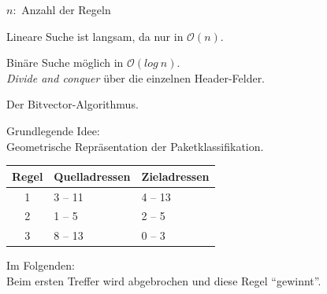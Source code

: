 \documentclass[xcolor=x11names,compress]{beamer}
\renewcommand{\(}{\begin{columns}}
\renewcommand{\)}{\end{columns}}
\newcommand{\<}[1]{\begin{column}{#1}}
\renewcommand{\>}{\end{column}}
\begin{document}
\begin{frame}
  $n:$ Anzahl der Regeln
  \begin{tcolorbox}[colback=red!5!white,colframe=red!75!black,title=Problem,drop fuzzy shadow]
  Lineare Suche ist langsam, da nur in $\mathcal O(n)$.
  \end{tcolorbox}
  \pause
  \begin{tcolorbox}[colback=yellow!5!white,colframe=yellow!75!black,title=Grundidee,drop fuzzy shadow]
  Binäre Suche möglich in $\mathcal O(log\ n)$.\\
  \textit{Divide and conquer} über die einzelnen Header-Felder.
  \end{tcolorbox}
  \pause
  \begin{tcolorbox}[colback=blue!5!white,colframe=blue!75!black,title=Mögliche Lösung,drop fuzzy shadow]
  Der Bitvector-Algorithmus.
  \end{tcolorbox}
\end{frame}

\begin{frame}
  Grundlegende Idee:\\
  Geometrische Repräsentation der Paketklassifikation.
  \pause
  \begin{table}
  \centering
  \begin{tabularx}{0.7\textwidth}{c|X|X}
  Regel&Quelladressen&Zieladressen\\
  \hline
  1&3 -- 11&4 -- 13\\
  2&1 -- 5&2 -- 5\\
  3&8 -- 13&0 -- 3\\
  \end{tabularx}
  \end{table}
  Im Folgenden:\\
  Beim ersten Treffer wird abgebrochen und diese Regel \enquote{gewinnt}.
\end{frame}
\end{document}
